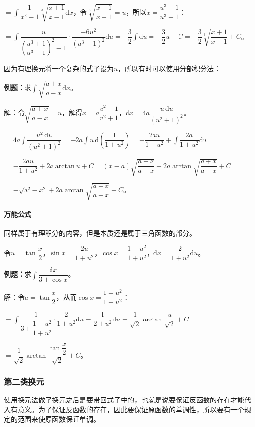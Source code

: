 \documentclass[UTF8, 12pt]{ctexart}
\begin{document}
$=\displaystyle{\int\dfrac{1}{x^2-1}\sqrt[3]{\dfrac{x+1}{x-1}}\textrm{d}x}$，令$\sqrt[3]{\dfrac{x+1}{x-1}}=u$，所以$x=\dfrac{u^3+1}{u^3-1}$：

$=\displaystyle{\int\dfrac{u}{\left(\dfrac{u^3+1}{u^3-1}\right)^2-1}\cdot\dfrac{-6u^2}{(u^3-1)^2}\textrm{d}u=-\dfrac{3}{2}\int\textrm{d}u}=-\dfrac{3}{2}u+C=-\dfrac{3}{2}\sqrt[3]{\dfrac{x+1}{x-1}}+C $。

因为有理换元将一个复杂的式子设为$u$，所以有时可以使用分部积分法：\medskip

\textbf{例题：}求$\displaystyle{\int\sqrt{\dfrac{a+x}{a-x}}\textrm{d}x}$。\medskip

解：令$\sqrt{\dfrac{a+x}{a-x}}=u$，解得$x=a\dfrac{u^2-1}{u^2+1}$，$\textrm{d}x=4a\dfrac{u\,\textrm{d}u}{(u^2+1)^2}$。

$=\displaystyle{4a\int\dfrac{u^2\,\textrm{d}u}{(u^2+1)^2}=-2a\int u\,\textrm{d}\left(\dfrac{1}{1+u^2}\right)=-\dfrac{2au}{1+u^2}+\int\dfrac{2a}{1+u^2}\textrm{d}u}$

$=-\dfrac{2au}{1+u^2}+2a\arctan u+C=(x-a)\sqrt{\dfrac{a+x}{a-x}}+2a\arctan\sqrt{\dfrac{a+x}{a-x}}+C$

$=-\sqrt{a^2-x^2}+2a\arctan\sqrt{\dfrac{a+x}{a-x}}+C$。

\paragraph{万能公式} \leavevmode \medskip

同样属于有理积分的内容，但是本质还是属于三角函数的部分。

令$u=\tan\dfrac{x}{2}$，$\sin x=\dfrac{2u}{1+u^2}$，$\cos x=\dfrac{1-u^2}{1+u^2}$，$\textrm{d}x=\dfrac{2}{1+u^2}\textrm{d}u$。

\textbf{例题：}求$\displaystyle{\int\dfrac{\textrm{d}x}{3+\cos x}}$。

解：令$u=\tan\dfrac{x}{2}$，从而$\cos x=\dfrac{1-u^2}{1+u^2}$：

$=\displaystyle{\int\dfrac{1}{3+\dfrac{1-u^2}{1+u^2}}\cdot\dfrac{2}{1+u^2}\textrm{d}u=\dfrac{1}{2+u^2}\textrm{d}u=\dfrac{1}{\sqrt{2}}\arctan\dfrac{u}{\sqrt{2}}+C}$

$=\dfrac{1}{\sqrt{2}}\arctan\dfrac{\tan\dfrac{x}{2}}{\sqrt{2}}+C$。

\subsubsection{第二类换元}

使用换元法做了换元之后是要带回式子中的，也就是说要保证反函数的存在才能代入有意义。为了保证反函数的存在，因此要保证原函数的单调性，所以要有一个规定的范围来使原函数保证单调。
\end{document}
